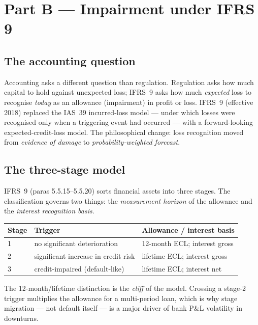 \documentclass[11pt,a4paper]{report}
\theoremstyle{definition}
\theoremstyle{plain}
\begin{document}
\chapter{Part B --- Impairment under IFRS 9}
\label{chap:ifrs9}

\section{The accounting question}

Accounting asks a different question than regulation. Regulation asks
how much capital to hold against unexpected loss; IFRS~9 asks how much
\emph{expected} loss to recognise \emph{today} as an allowance
(impairment) in profit or loss. IFRS~9 (effective 2018) replaced the
IAS~39 incurred-loss model --- under which losses were recognised only
when a triggering event had occurred --- with a forward-looking
expected-credit-loss model. The philosophical change: loss recognition
moved from \emph{evidence of damage} to \emph{probability-weighted
forecast}.

\section{The three-stage model}

IFRS~9 (paras 5.5.15--5.5.20) sorts financial assets into three stages.
The classification governs two things: the \emph{measurement horizon}
of the allowance and the \emph{interest recognition basis}.

\begin{center}
\begin{tabular}{lll}
\toprule
Stage & Trigger & Allowance / interest basis\\
\midrule
1 & no significant deterioration & 12-month ECL; interest gross\\
2 & significant increase in credit risk & lifetime ECL; interest gross\\
3 & credit-impaired (default-like) & lifetime ECL; interest net\\
\bottomrule
\end{tabular}
\end{center}

The 12-month/lifetime distinction is the \emph{cliff} of the model.
Crossing a stage-2 trigger multiplies the allowance for a multi-period
loan, which is why stage migration --- not default itself --- is a major
driver of bank P\&L volatility in downturns.
\end{document}
